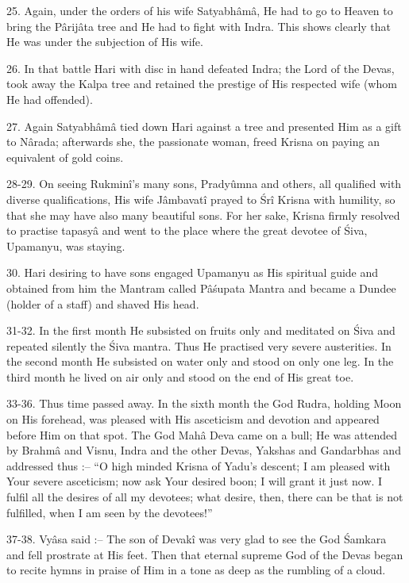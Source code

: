 25. Again, under the orders of his wife Satyabh\^am\^a, He had to go to Heaven to bring the P\^arij\^ata tree and He had to fight with Indra. This shows clearly that He was under the subjection of His wife.

26. In that battle Hari with disc in hand defeated Indra; the Lord of the Devas, took away the Kalpa tree and retained the prestige of His respected wife (whom He had offended).

27. Again Satyabh\^am\^a tied down Hari against a tree and presented Him as a gift to N\^arada; afterwards she, the passionate woman, freed Krisna on paying an equivalent of gold coins.

28-29. On seeing Rukmin\^i's many sons, Pradyûmna and others, all qualified with diverse qualifications, His wife J\^ambavat\^i prayed to \'Sr\^i Krisna with humility, so that she may have also many beautiful sons. For her sake, Krisna firmly resolved to practise tapasy\^a and went to the place where the great devotee of \'Siva, Upamanyu, was staying.

30. Hari desiring to have sons engaged Upamanyu as His spiritual guide and obtained from him the Mantram called P\^a\'supata Mantra and became a Dundee (holder of a staff) and shaved His head.

31-32. In the first month He subsisted on fruits only and meditated on \'Siva and repeated silently the \'Siva mantra. Thus He practised very severe austerities. In the second month He subsisted on water only and stood on only one leg. In the third month he lived on air only and stood on the end of His great toe.

33-36. Thus time passed away. In the sixth month the God Rudra, holding Moon on His forehead, was pleased with His asceticism and devotion and appeared before Him on that spot. The God Mah\^a Deva came on a bull; He was attended by Brahm\^a  and Visnu, Indra and the other Devas, Yakshas and Gandarbhas and addressed thus :-- ``O high minded Krisna of Yadu's descent; I am pleased with Your severe asceticism; now ask Your desired boon; I will grant it just now. I fulfil all the desires of all my devotees; what desire, then, there can be that is not fulfilled, when I am seen by the devotees!''

37-38. Vy\^asa said :-- The son of Devak\^i was very glad to see the God \'Samkara and fell prostrate at His feet. Then that eternal supreme God of the Devas began to recite hymns in praise of Him in a tone as deep as the rumbling of a cloud.

